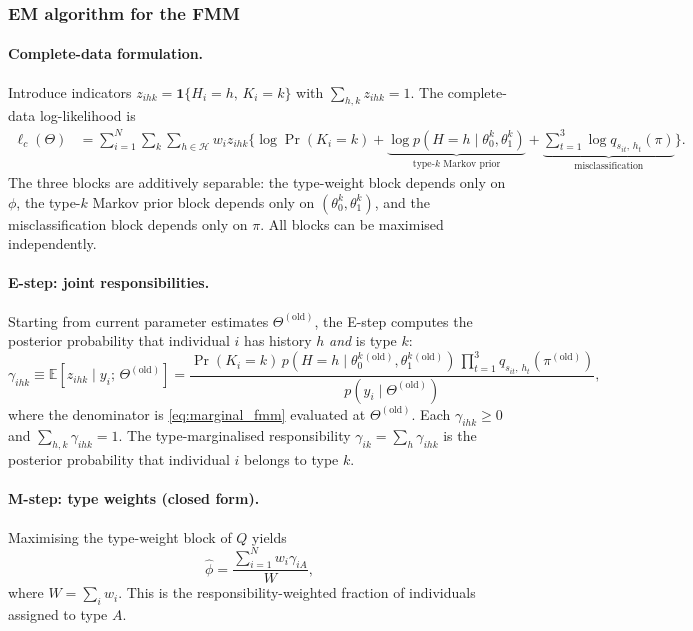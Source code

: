 \subsubsection{EM algorithm for the FMM}

\paragraph{Complete-data formulation.}
Introduce indicators \(z_{ihk} = \mathbf{1}\{H_i = h,\, K_i = k\}\)
with \(\sum_{h,k} z_{ihk} = 1\). The complete-data log-likelihood is
\begin{align}
\ell_c(\Theta) &= \sum_{i=1}^{N} \sum_{k} \sum_{h \in \mathcal{H}}
  w_i z_{ihk} \bigg\{
    \log \Pr(K_i = k) +
    \underbrace{\log p(H = h \mid \theta_0^k, \theta_1^k)}_{\text{type-}k\text{ Markov prior}}
    + \underbrace{\sum_{t=1}^{3} \log q_{s_{it},\, h_t}(\pi)}_{\text{misclassification}}
  \bigg\}.
\label{eq:complete_ll_fmm}
\end{align}
The three blocks are additively separable: the type-weight block depends
only on \(\phi\), the type-\(k\) Markov prior block depends only on
\((\theta_0^k, \theta_1^k)\), and the misclassification block depends
only on \(\pi\). All blocks can be maximised independently.

\paragraph{E-step: joint responsibilities.}
Starting from current parameter estimates \(\Theta^{(\text{old})}\),
the E-step computes the posterior probability that individual \(i\) has
history \(h\) \emph{and} is type \(k\):
\begin{equation}
\gamma_{ihk} \equiv \mathbb{E}[z_{ihk} \mid y_i;\, \Theta^{(\text{old})}]
= \frac{
  \Pr(K_i = k)\,
  p(H = h \mid \theta_0^k{}^{(\text{old})}, \theta_1^k{}^{(\text{old})})\,
  \prod_{t=1}^{3} q_{s_{it},\, h_t}(\pi^{(\text{old})})
}{
  p(y_i \mid \Theta^{(\text{old})})
},
\label{eq:responsibility_fmm}
\end{equation}
where the denominator is \eqref{eq:marginal_fmm} evaluated at
\(\Theta^{(\text{old})}\). Each \(\gamma_{ihk} \geq 0\) and
\(\sum_{h,k} \gamma_{ihk} = 1\). The type-marginalised responsibility
\(\gamma_{ik} = \sum_{h} \gamma_{ihk}\) is the posterior probability
that individual \(i\) belongs to type \(k\).

\paragraph{M-step: type weights (closed form).}
Maximising the type-weight block of \(Q\) yields
\begin{equation}
\hat{\phi} = \frac{\sum_{i=1}^{N} w_i \gamma_{iA}}{W},
\label{eq:mstep_phi}
\end{equation}
where \(W = \sum_i w_i\). This is the responsibility-weighted fraction
of individuals assigned to type \(A\).


